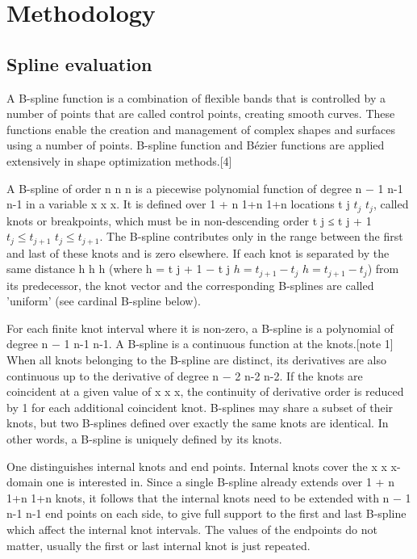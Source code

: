 \documentclass[main.tex]{subfiles}
\begin{document}
\chapter{Methodology}

\section{Spline evaluation}
A B-spline function is a combination of flexible bands that is controlled by a number of points that are called control points, creating smooth curves. These functions enable the creation and management of complex shapes and surfaces using a number of points. B-spline function and Bézier functions are applied extensively in shape optimization methods.[4]

A B-spline of order n { n} n is a piecewise polynomial function of degree n − 1 { n-1} n-1 in a variable x { x} x. It is defined over 1 + n { 1+n} { 1+n} locations t j { $t_{j}$} { $t_{j}$}, called knots or breakpoints, which must be in non-descending order t j ≤ t j + 1 { $t_{j}\leq t_{j+1}$} { $t_{j}\leq t_{j+1}$}. The B-spline contributes only in the range between the first and last of these knots and is zero elsewhere. If each knot is separated by the same distance h { h} h (where h = t j + 1 − t j { $h=t_{j+1}-t_{j}$} {$h=t_{j+1}-t_{j}$}) from its predecessor, the knot vector and the corresponding B-splines are called 'uniform' (see cardinal B-spline below).

For each finite knot interval where it is non-zero, a B-spline is a polynomial of degree n − 1 { n-1} n-1. A B-spline is a continuous function at the knots.[note 1] When all knots belonging to the B-spline are distinct, its derivatives are also continuous up to the derivative of degree n − 2 { n-2} n-2. If the knots are coincident at a given value of x { x} x, the continuity of derivative order is reduced by 1 for each additional coincident knot. B-splines may share a subset of their knots, but two B-splines defined over exactly the same knots are identical. In other words, a B-spline is uniquely defined by its knots.

One distinguishes internal knots and end points. Internal knots cover the x { x} x-domain one is interested in. Since a single B-spline already extends over 1 + n { 1+n} { 1+n} knots, it follows that the internal knots need to be extended with n − 1 { n-1} n-1 end points on each side, to give full support to the first and last B-spline which affect the internal knot intervals. The values of the endpoints do not matter, usually the first or last internal knot is just repeated.\\
\end{document}
